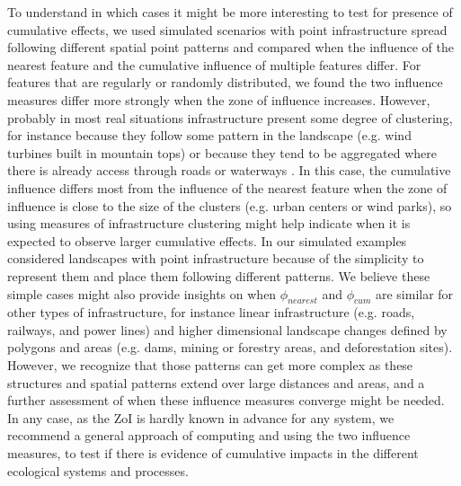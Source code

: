\documentclass[titlepage]{article}
\begin{document}
To understand in which cases it might be more interesting to test for presence of cumulative effects, we used simulated scenarios with point infrastructure spread following different spatial point patterns and compared when the influence of the nearest feature and the cumulative influence of multiple features differ. For features that are regularly or randomly distributed, we found the two influence measures differ more strongly when the zone of influence increases. However, probably in most real situations infrastructure present some degree of clustering, for instance because they follow some pattern in the landscape (e.g. wind turbines built in mountain tops) or because they tend to be aggregated where there is already access through roads or waterways \citealp{barber_roads_2014}. In this case, the cumulative influence differs most from the influence of the nearest feature when the zone of influence is close to the size of the clusters (e.g. urban centers or wind parks), so using measures of infrastructure clustering might help indicate when it is expected to observe larger cumulative effects. In our simulated examples considered landscapes with point infrastructure because of the simplicity to represent them and place them following different patterns. We believe these simple cases might also provide insights on when $\phi_{nearest}$ and $\phi_{cum}$ are similar for other types of infrastructure, for instance linear infrastructure (e.g. roads, railways, and power lines) and higher dimensional landscape changes defined by polygons and areas (e.g. dams, mining or forestry areas, and deforestation sites). However, we recognize that those patterns can get more complex as these structures and spatial patterns extend over large distances and areas, and a further assessment of when these influence measures converge might be needed. In any case, as the ZoI is hardly known in advance for any system, we recommend a general approach of computing and using the two influence measures, to test if there is evidence of cumulative impacts in the different ecological systems and processes.
\end{document}
